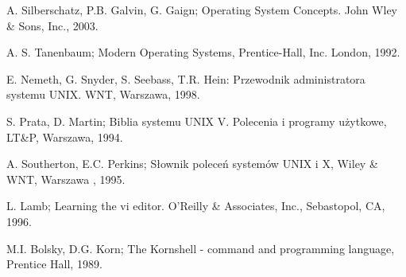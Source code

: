 \documentclass[11pt]{article}
\begin{document}
A. Silberschatz, P.B. Galvin, G. Gaign; Operating System Concepts. John Wley \& Sons, Inc., 2003.

A. S. Tanenbaum; Modern Operating Systems, Prentice-Hall, Inc. London, 1992.

E. Nemeth, G. Snyder, S. Seebass, T.R. Hein: Przewodnik administratora systemu UNIX. WNT, Warszawa, 1998.

S. Prata, D. Martin; Biblia systemu UNIX V. Polecenia i programy użytkowe, LT\&P, Warszawa, 1994.

A. Southerton, E.C. Perkins; Słownik poleceń systemów UNIX i X, Wiley \& WNT, Warszawa , 1995.

L. Lamb; Learning the vi editor. O'Reilly \& Associates, Inc., Sebastopol, CA, 1996.

M.I. Bolsky, D.G. Korn; The Kornshell - command and programming language, Prentice Hall,
1989.
\end{document}

